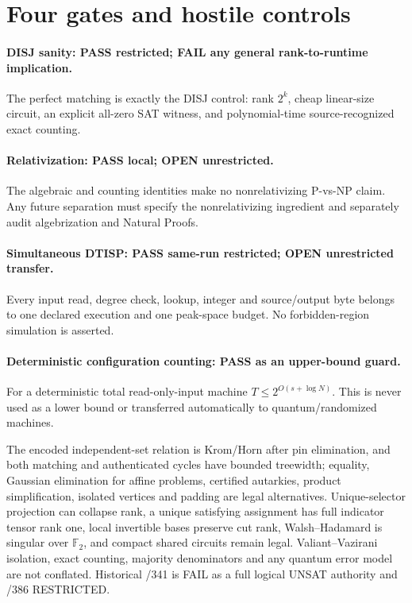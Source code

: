 \documentclass[11pt]{article}
\begin{document}
\section{Four gates and hostile controls}
\paragraph{DISJ sanity: PASS restricted; FAIL any general rank-to-runtime implication.}
The perfect matching is exactly the DISJ control: rank $2^k$, cheap linear-size circuit, an explicit all-zero SAT witness, and polynomial-time source-recognized exact counting.

\paragraph{Relativization: PASS local; OPEN unrestricted.}
The algebraic and counting identities make no nonrelativizing P-vs-NP claim. Any future separation must specify the nonrelativizing ingredient and separately audit algebrization and Natural Proofs.

\paragraph{Simultaneous DTISP: PASS same-run restricted; OPEN unrestricted transfer.}
Every input read, degree check, lookup, integer and source/output byte belongs to one declared execution and one peak-space budget. No forbidden-region simulation is asserted.

\paragraph{Deterministic configuration counting: PASS as an upper-bound guard.}
For a deterministic total read-only-input machine $T\leq 2^{O(s+\log N)}$. This is never used as a lower bound or transferred automatically to quantum/randomized machines.

The encoded independent-set relation is Krom/Horn after pin elimination, and both matching and authenticated cycles have bounded treewidth; equality, Gaussian elimination for affine problems, certified autarkies, product simplification, isolated vertices and padding are legal alternatives. Unique-selector projection can collapse rank, a unique satisfying assignment has full indicator tensor rank one, local invertible bases preserve cut rank, Walsh--Hadamard is singular over $\mathbb F_2$, and compact shared circuits remain legal. Valiant--Vazirani isolation, exact counting, majority denominators and any quantum error model are not conflated. Historical /341 is FAIL as a full logical UNSAT authority and /386 RESTRICTED.
\end{document}
